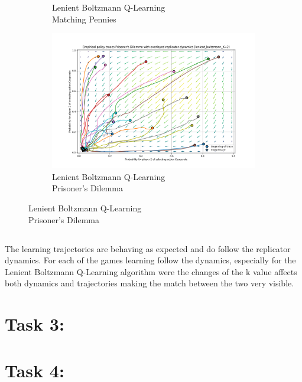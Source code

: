 \documentclass[12pt,letterpaper, onecolumn]{exam}
\begin{document}
\begin{figure}
\begin{subfigure}{.5\textwidth}
      \caption{Lenient Boltzmann Q-Learning\\ Matching Pennies}
      \label{fig:sfiglbmp}
    \end{subfigure}%
    \begin{subfigure}{.5\textwidth}
      \centering
      \includegraphics[width=.6\linewidth]{plots/replicator_trajectoreis_Prisoner's Dilemma_lenient_boltzmann_K=2.png}
      \caption{Lenient Boltzmann Q-Learning\\ Prisoner's Dilemma}
      \label{fig:sfiglbpd}
    \end{subfigure}%
\end{figure}

\subsection{}

The learning trajectories are behaving as expected and do follow the replicator dynamics. For each of the games learning follow the dynamics, especially for the Lenient Boltzmann Q-Learning algorithm
were the changes of the k value affects both dynamics and trajectories making the match between the two very visible.

\section{\textbf{Task 3:}}

\section{\textbf{Task 4:}}
\end{document}

